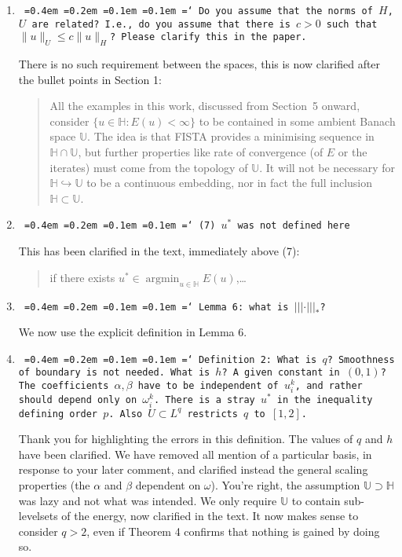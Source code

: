 \documentclass[12pt]{article}
\newcommand*\justify{%
	\fontdimen2\font=0.4em%
	\fontdimen3\font=0.2em%
	\fontdimen4\font=0.1em%
	\fontdimen7\font=0.1em%
	\hyphenchar\font=`\-%
}
\newcommand{\review}[1]{\texttt{\justify{#1}}}
\newcommand{\F}[1]{\mathbb{#1}}
\newcommand{\edit}[2]{{\color{red}\sout{#1}}{\color{darkgreen}#2}}
\begin{document}
\begin{enumerate}
	\item \review{Do you assume that the norms of $H$, $U$ are related? I.e., do you assume that there is $c>0$ such that $\lVert u\rVert_U\leq c\lVert u\rVert_H$? Please clarify this in the paper.} 
	
	There is no such requirement between the spaces, this is now clarified after the bullet points in Section 1:
	\begin{quote}
		\edit{}{All the examples in this work, discussed from Section~5 onward, consider $\{u\in\F H: E(u)<\infty\}$ to be contained in some ambient Banach space $\F{U}$. The idea is that FISTA provides a minimising sequence in $\F H\cap\F U$, but further properties like rate of convergence (of $E$ or the iterates) must come from the topology of $\F{U}$. It will not be necessary for $\F H\hookrightarrow\F U$ to be a continuous embedding, nor in fact the full inclusion $\F H\subset\F U$.}
	\end{quote}
	
	\item \review{(7) $u^*$ was not defined here}
	
	This has been clarified in the text, immediately above (7):
	\begin{quote}\edit{}{if there exists $u^*\in \operatorname{argmin}_{u\in\F H}{E}(u)$,\ldots}\end{quote}

	\item \review{Lemma 6: what is $|||\cdot|||_*$?}
	
	We now use the explicit definition in Lemma 6. 

	\item \review{Definition 2: What is $q$? Smoothness of boundary is not needed. What is $h$? A given constant in $(0,1)$? The coefficients $\alpha,\beta$ have to be independent of $u_i^k$, and rather should depend only on $\omega_i^k$. There is a stray $u^*$ in the inequality defining order $p$. Also $U\subset L^q$ restricts $q$ to $[1,2]$.}
	
	Thank you for highlighting the errors in this definition. The values of $q$ and $h$ have been clarified. We have removed all mention of a particular basis, in response to your later comment, and clarified instead the general scaling properties (the $\alpha$ and $\beta$ dependent on $\omega$). You're right, the assumption $\F U\supset\F H$ was lazy and not what was intended. We only require $\F U$ to contain sub-levelsets of the energy, now clarified in the text. It now makes sense to consider $q>2$, even if Theorem 4 confirms that nothing is gained by doing so.
	

\end{enumerate}
\end{document}
